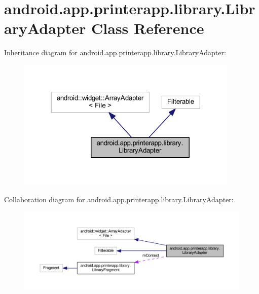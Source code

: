 \hypertarget{classandroid_1_1app_1_1printerapp_1_1library_1_1_library_adapter}{}\section{android.\+app.\+printerapp.\+library.\+Library\+Adapter Class Reference}
\label{classandroid_1_1app_1_1printerapp_1_1library_1_1_library_adapter}


Inheritance diagram for android.\+app.\+printerapp.\+library.\+Library\+Adapter\+:
\nopagebreak
\begin{figure}[H]
\begin{center}
\leavevmode
\includegraphics[width=300pt]{classandroid_1_1app_1_1printerapp_1_1library_1_1_library_adapter__inherit__graph}
\end{center}
\end{figure}


Collaboration diagram for android.\+app.\+printerapp.\+library.\+Library\+Adapter\+:
\nopagebreak
\begin{figure}[H]
\begin{center}
\leavevmode
\includegraphics[width=350pt]{classandroid_1_1app_1_1printerapp_1_1library_1_1_library_adapter__coll__graph}
\end{center}
\end{figure}
